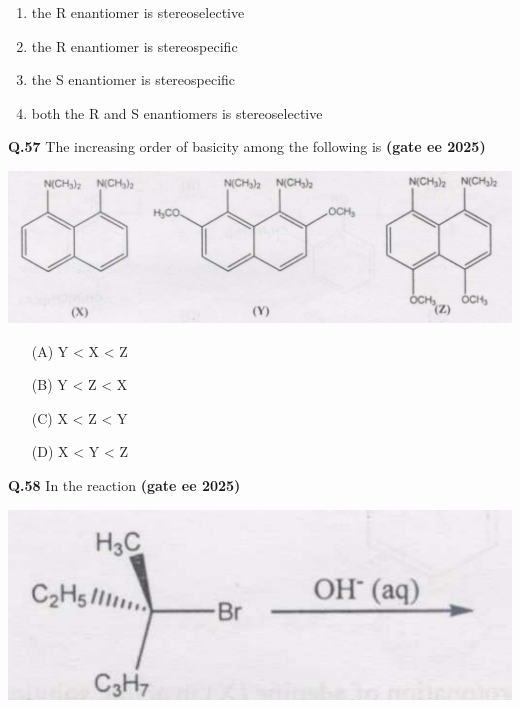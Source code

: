 \documentclass[journal,12pt,onecolumn]{exam}
\theoremstyle{remark}
\begin{document}
\begin{multicols}{2}
\begin{enumerate}
    \item the R enantiomer is stereoselective
    \item the R enantiomer is stereospecific
    \item the S enantiomer is stereospecific
    \item both the R and S enantiomers is stereoselective
\end{enumerate}
\end{multicols}

 \vspace{0.5 cm}


\noindent\textbf{Q.57} The increasing order of basicity among the following is \hfill{\textbf{(gate ee 2025)}}

\includegraphics[scale=0.75]{images/image1.png}

\begin{multicols}{2}
\begin{itemize}
    \item[(A)] Y < X < Z
    \item[(B)] Y < Z < X
    \item[(C)] X < Z < Y
    \item[(D)] X < Y < Z
\end{itemize}
\end{multicols}

\vspace{0.5cm}

\noindent\textbf{Q.58} In the reaction \hfill{\textbf{(gate ee 2025)}}

\includegraphics[scale=0.75]{images/image2.png}
\end{document}
